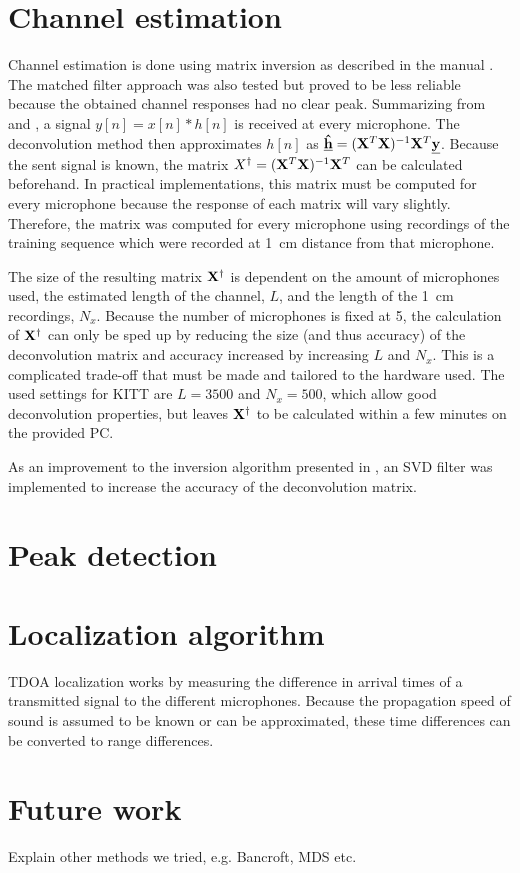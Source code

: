 \documentclass[11pt,titlepage]{report}
\begin{document}
\section{Channel estimation}
\label{sec:loc_est_h}
Channel estimation is done using matrix inversion as described in the manual \cite{epo4-manual}. The matched filter approach was also tested but proved to be less reliable because the obtained channel responses had no clear peak. Summarizing from \cite{epo4-manual} and \cite{epo4-del7}, a signal $y[n]=x[n]*h[n]$ is received at every microphone. The deconvolution method then approximates $h[n]$ as $\mathbf{\underline{\hat{h}}}=(\mathbf{X}^T\mathbf{X})^{-1}\mathbf{X}^T\mathbf{\underline{y}}$. Because the sent signal is known, the matrix $X^\dagger=(\mathbf{X}^T\mathbf{X})^{-1}\mathbf{X}^T$ can be calculated beforehand. In practical implementations, this matrix must be computed for every microphone because the response of each matrix will vary slightly. Therefore, the matrix was computed for every microphone using recordings of the training sequence which were recorded at \SI{1}{cm} distance from that microphone.

The size of the resulting matrix $\mathbf{X}^\dagger$ is dependent on the amount of microphones used, the estimated length of the channel, $L$, and the length of the \SI{1}{cm} recordings, $N_x$. Because the number of microphones is fixed at \num{5}, the calculation of $\mathbf{X}^\dagger$ can only be sped up by reducing the size (and thus accuracy) of the deconvolution matrix and accuracy increased by increasing $L$ and $N_x$. This is a complicated trade-off that must be made and tailored to the hardware used. The used settings for KITT are $L=3500$ and $N_x=500$, which allow good deconvolution properties, but leaves $\mathbf{X}^\dagger$ to be calculated within a few minutes on the provided PC.

As an improvement to the inversion algorithm presented in \cite{epo4-manual}, an SVD filter was implemented to increase the accuracy of the deconvolution matrix. 


\section{Peak detection}
\label{sec:loc_peak}

\section{Localization algorithm}
\label{sec:loc_alg}
TDOA localization works by measuring the difference in arrival times of a transmitted signal to the different microphones. Because the propagation speed of sound is assumed to be known or can be approximated, these time differences can be converted to range differences. 

\section{Future work}
\label{sec:loc_future}
Explain other methods we tried, e.g. Bancroft, MDS etc.
\end{document}
